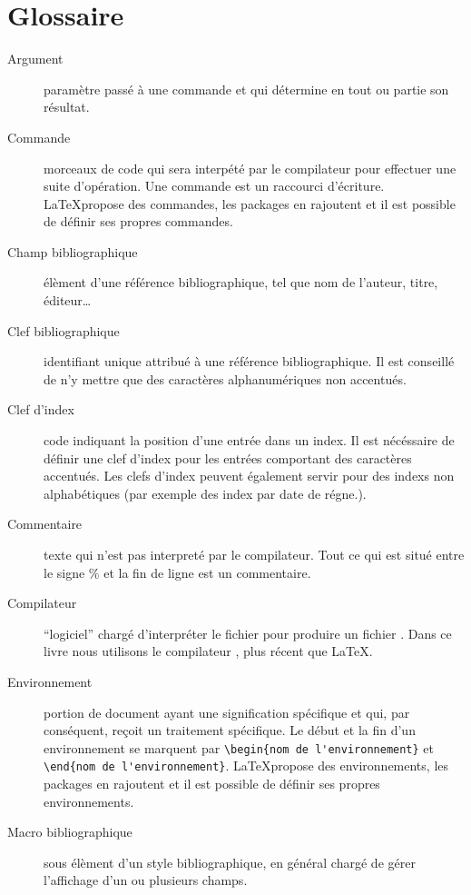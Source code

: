 \chapter{Glossaire}


\begin{description}
\item[Argument] paramètre passé à une commande et qui détermine en tout ou partie son résultat.
\item[Commande] morceaux de code qui sera interpété par le compilateur pour effectuer une suite d'opération. Une commande est un raccourci d'écriture. \LaTeX propose des commandes, les packages en rajoutent et il est possible de définir ses propres commandes.

\item[Champ bibliographique]élèment d'une référence bibliographique, tel que nom de l'auteur, titre, éditeur…

\item[Clef bibliographique]identifiant unique attribué à une référence bibliographique. Il est conseillé de n'y mettre que des caractères alphanumériques non accentués.

\item[Clef d'index] code indiquant la position d'une entrée dans un index. Il est nécéssaire de définir une clef d'index pour les entrées comportant des caractères accentués. Les clefs d'index peuvent également servir pour des indexs non alphabétiques (par exemple des index par date de régne.).
\item[Commentaire] texte qui n'est pas interpreté par le compilateur. Tout ce qui est situé entre le signe \% et la fin de ligne est un commentaire.

\item[Compilateur]\enquote{logiciel} chargé d'interpréter le fichier  pour produire un fichier . Dans ce livre nous utilisons le compilateur \XeLaTeX, plus récent que \LaTeX.

\item[Environnement]portion de document ayant une signification spécifique et qui, par conséquent, reçoit un traitement spécifique. Le début et la fin d'un environnement se marquent par \verb|\begin{nom de l'environnement}| et \verb|\end{nom de l'environnement}|. \LaTeX propose des environnements, les packages en rajoutent et il est possible de définir ses propres environnements.

\item[Macro bibliographique]sous élèment d'un style bibliographique, en général chargé de gérer l'affichage d'un ou plusieurs champs.


\end{description}
